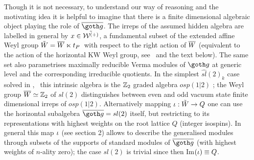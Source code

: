 Though it is not necessary, to understand our way of reasoning
and the motivating idea it is helpful to imagine that there is a
finite dimensional algebraic object playing the role of $\bgo$.
The irreps of the assumed hidden  algebra are labelled  
in general by
$x\in\tilde{{\cal W}^{(+)}}$, a fundamental subset of the extended affine Weyl group
$\tilde W=\overline W\ltimes t_P \,$ with respect to the right action of $\overline W$
(equivalent to the action of the horizontal KW Weyl group, see
\KW\ and the text below).  The same set  also parametrises
maximally reducible Verma modules of $\go$ at generic level and
the corresponding irreducible quotients.  In the simplest
$\widehat{sl}(2)_k$  case solved in \AY, \FMa\ this intrinsic algebra
is the $\Bbb Z_2$ graded algebra $osp(1|2)$ \FM; 
the Weyl group $\overline W\simeq \Bbb Z_2$ of $sl(2)$ distinguishes between 
even and odd vacuum state finite dimensional
irreps of $osp(1|2)$.   Alternatively
mapping $\iota:\tilde W \rightarrow Q$ one can use the horizontal
subalgebra $\bgo=sl(2)$ itself, but restricting to its
representations with highest weights on the root lattice $Q$
(integer isospins).  In general this map $\iota$ (see section 2)
allows to describe the generalised modules through subsets of the
supports of standard  modules of $\bgo$ (with  highest weights of
$n$-ality zero); the case $sl(2)$ is trivial since then
Im$(\iota) \equiv Q$.


